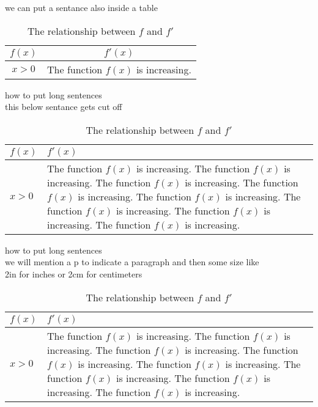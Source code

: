 \documentclass[24pt]{article}
\begin{document}
\vspace{1cm}

we can put a sentance also inside a table\\
\begin{table}[H]
\centering
\caption{The relationship between $f$ and $f'$}
\def\arraystretch{1.8}
\begin{tabular}{|c|c|}
\hline
$f(x)$ & $f'(x)$ \\ \hline
$x>0$ & The function $f(x)$ is increasing. \\ \hline
\end{tabular}
\end{table}


\vspace{1cm}

how to put long sentences\\
this below sentance gets cut off\\
\begin{table}[H]
\centering
\caption{The relationship between $f$ and $f'$}
\def\arraystretch{1.8}
\begin{tabular}{|l|l|}
\hline
$f(x)$ & $f'(x)$ \\ \hline
$x>0$ & The function $f(x)$ is increasing. The function $f(x)$ is increasing. The function $f(x)$ is increasing. The function $f(x)$ is increasing. The function $f(x)$ is increasing. The function $f(x)$ is increasing. The function $f(x)$ is increasing. The function $f(x)$ is increasing. \\ \hline
\end{tabular}
\end{table}


\vspace{1cm}

how to put long sentences\\
we will mention a p to indicate a paragraph and then some size like\\
2in for inches or 2cm for centimeters\\
\begin{table}[H]
\centering
\caption{The relationship between $f$ and $f'$}
\def\arraystretch{1.8}
\begin{tabular}{|l|p{2in}|}
\hline
$f(x)$ & $f'(x)$ \\ \hline
$x>0$ & The function $f(x)$ is increasing. The function $f(x)$ is increasing. The function $f(x)$ is increasing. The function $f(x)$ is increasing. The function $f(x)$ is increasing. The function $f(x)$ is increasing. The function $f(x)$ is increasing. The function $f(x)$ is increasing. \\ \hline
\end{tabular}
\end{table}
\end{document}
